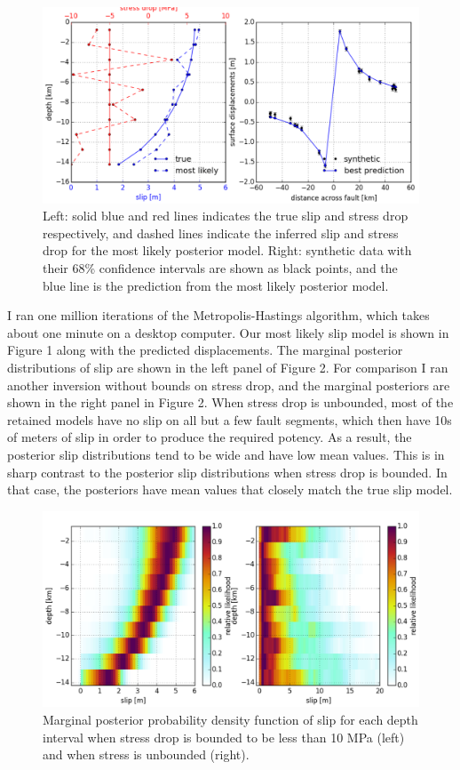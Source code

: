 \documentclass[12pt]{article}
\begin{document}
\begin{figure}
\includegraphics[width=1.0\textwidth]{figure_1}
\caption{Left: solid blue and red lines indicates the true slip and stress drop respectively, and dashed lines indicate the inferred slip and stress drop for the most likely posterior model.  Right: synthetic data with their 68\% confidence intervals are shown as black points, and the blue line is the prediction from the most likely posterior model.}  
\end{figure}

I ran one million iterations of the Metropolis-Hastings algorithm, which takes about one minute on a desktop computer.  Our most likely slip model is shown in Figure 1 along with the predicted displacements.  The marginal posterior distributions of slip are shown in the left panel of Figure 2.  For comparison I ran another inversion without bounds on stress drop, and the marginal posteriors are shown in the right panel in Figure 2.  When stress drop is unbounded, most of the retained models have no slip on all but a few fault segments, which then have 10s of meters of slip in order to produce the required potency.  As a result, the posterior slip distributions tend to be wide and have low mean values.  This is in sharp contrast to the posterior slip distributions when stress drop is bounded.  In that case, the posteriors have mean values that closely match the true slip model.   

\begin{figure}
\includegraphics[width=1.0\textwidth]{figure_2}
\raggedleft
\caption{Marginal posterior probability density function of slip for each depth interval when stress drop is bounded to be less than 10 MPa (left) and when stress is unbounded (right).}  
\end{figure}
\end{document}
